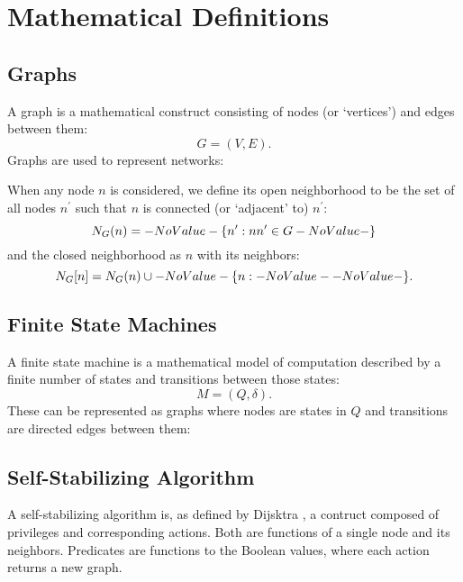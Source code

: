 \section{Mathematical Definitions}
\label{sec:math-defin}

\subsection{Graphs}
\label{sec:math-defin:graphs}

A \gls{graph} is a mathematical construct
  consisting of \glspl{node} (or `vertices') and \glspl{edge} between them:
  \[ G = (V, E). \]
Graphs are used to represent networks:

When any node $n$ is considered, we define its \gls{open neighborhood} to be
  the set of all nodes $n^\prime$ such that $n$ is connected (or `adjacent' to) $n^\prime$:
  \[ \OpenNeighborhood{n}[G] = \Set{n^\prime}[nn^\prime \in G] \]
  and the \gls{closed neighborhood} as $n$ with its neighbors:
  \[ \ClosedNeighborhood{n}[G] = \OpenNeighborhood{n}[G] \cup \Set{n}. \]

\subsection{Finite State Machines}
\label{sec:math-defin:fsm}

A \gls{finite state machine} is a mathematical model of computation
  described by a finite number of states and transitions between those states:
  \[ M = (Q, \delta). \]
These can be represented as graphs where nodes are states in $Q$ and
  transitions are directed edges between them:

\subsection{Self-Stabilizing Algorithm}
\label{sec:math-defin:self-stab-algor}

A self-stabilizing algorithm is, as defined by
  Dijsktra \autocite{Dijkstra:1974:SSS:361179.361202},
  a contruct composed of \glspl{privilege} and corresponding \glspl{action}.
Both are functions of a single node and its neighbors.
Predicates are functions to the Boolean values,
  where each action returns a new graph.

